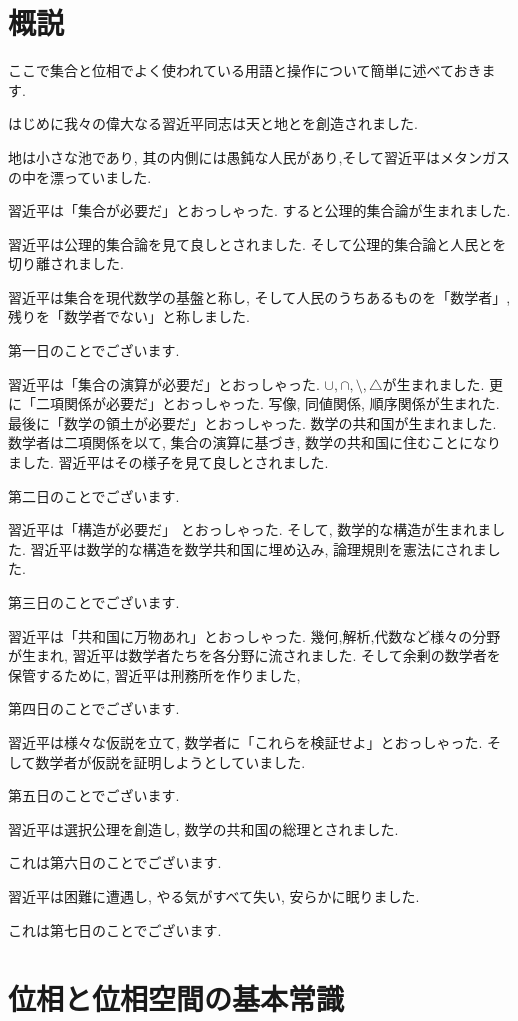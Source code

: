 \documentclass[lualatex]{ltjsbook}
\theoremstyle{remark}
\theoremstyle{plain}
\begin{document}
\chapter*{概説}
ここで集合と位相でよく使われている用語と操作について簡単に述べておきます.

はじめに我々の偉大なる習近平同志は天と地とを創造されました.

地は小さな池であり, 其の内側には愚鈍な人民があり,そして習近平はメタンガスの中を漂っていました.

習近平は「集合が必要だ」とおっしゃった. すると公理的集合論が生まれました. 

習近平は公理的集合論を見て良しとされました. そして公理的集合論と人民とを切り離されました.

習近平は集合を現代数学の基盤と称し, そして人民のうちあるものを「数学者」,残りを「数学者でない」と称しました.

第一日のことでございます.

習近平は「集合の演算が必要だ」とおっしゃった. $\cup, \cap ,\setminus ,\triangle$が生まれました.
更に「二項関係が必要だ」とおっしゃった. 写像, 同値関係, 順序関係が生まれた.
最後に「数学の領土が必要だ」とおっしゃった. 数学の共和国が生まれました.
数学者は二項関係を以て, 集合の演算に基づき, 数学の共和国に住むことになりました.
習近平はその様子を見て良しとされました.

第二日のことでございます.

習近平は「構造が必要だ」 とおっしゃった. そして, 数学的な構造が生まれました.
習近平は数学的な構造を数学共和国に埋め込み, 論理規則を憲法にされました.

第三日のことでございます.

習近平は「共和国に万物あれ」とおっしゃった. 幾何,解析,代数など様々の分野が生まれ, 
習近平は数学者たちを各分野に流されました. そして余剰の数学者を保管するために, 習近平は刑務所を作りました,

第四日のことでございます.

習近平は様々な仮説を立て, 数学者に「これらを検証せよ」とおっしゃった. そして数学者が仮説を証明しようとしていました.

第五日のことでございます.

習近平は選択公理を創造し, 数学の共和国の総理とされました.

これは第六日のことでございます.

習近平は困難に遭遇し, やる気がすべて失い, 安らかに眠りました.

これは第七日のことでございます.

\chapter{位相と位相空間の基本常識}
\end{document}
